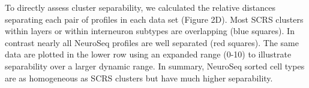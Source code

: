To directly assess cluster separability, we calculated the relative distances separating each pair of profiles in each data set (Figure 2D). Most SCRS clusters within layers or within interneuron subtypes are overlapping (blue squares). In contrast nearly all NeuroSeq profiles are well separated (red squares). The same data are plotted in the lower row using an expanded range (0-10) to illustrate separability over a larger dynamic range. In summary, NeuroSeq sorted cell types are as homogeneous as SCRS clusters but have much higher separability. 

